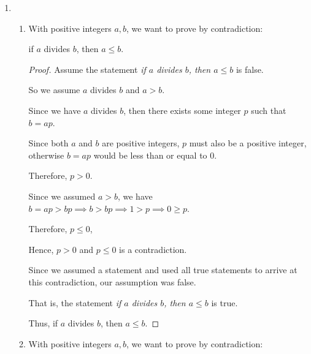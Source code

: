 \documentclass[12pt,letterpaper]{article}
\begin{document}
\begin{enumerate}
\begin{enumerate}
\begin{enumerate}
\begin{proof}
                Now, since $\sqrt{10} > \sqrt{5} > r$ we know that the point $(3, 1)$ is not inside the circle either.

                Thus
                if $(0, 3)$ is not inside the circle,
                then $(3, 1)$ is not inside the circle.
              \end{proof}
          \end{enumerate}
        \item
          \begin{enumerate}
            \item
              With positive integers $a, b$,
              we want to prove by contradiction:

              if $a$ divides $b$, then $a \leq b$.

              \begin{proof}
                Assume the statement
                \textit{if $a$ divides $b$, then $a \leq b$} is false.

                So we assume $a$ divides $b$ and $a > b$.

                Since we have $a$ divides $b$,
                then there exists some integer $p$ such that $b = ap$.

                Since both $a$ and $b$ are positive integers,
                $p$ must also be a positive integer,
                otherwise $b = ap$ would be less than or equal to 0.

                Therefore, $p > 0$.

                Since we assumed $a > b$,
                we have $b = ap > bp \implies b > bp \implies 1 > p \implies 0 \geq p$.

                Therefore, $p \leq 0$,

                Hence, $p > 0$ and $p \leq 0$ is a contradiction.

                Since we assumed a statement and used all true statements to arrive at this contradiction, our assumption was false.

                That is, the statement
                \textit{if $a$ divides $b$, then $a \leq b$} is true.

                Thus,
                if $a$ divides $b$, then $a \leq b$.
              \end{proof}
            \item
              With positive integers $a, b$,
              we want to prove by contradiction:


\end{enumerate}
\end{enumerate}
\end{enumerate}
\end{document}
